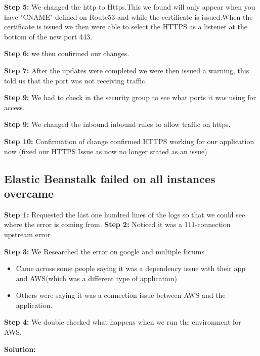 \textbf{Step 5:}\hfill \break
We changed the http to Https.This we found will only appear when you have "CNAME" defined on Route53 and while the certificate is issued.When the certificate is issued we then were able to select the HTTPS as a listener at the bottom of the new port 443.\hfill \break

\textbf{Step 6:}\hfill \break
we then confirmed our changes.\hfill \break

\textbf{Step 7:}\hfill \break
After the updates were completed we were then issued a warning, this told us that the port was not receiving traffic.\hfill \break

\textbf{Step 9:}\hfill \break
We had to check in the security group to see what ports it was using for access.\hfill \break
 
\textbf{Step 9:}\hfill \break
We changed  the inbound inbound rules to allow traffic on https.\hfill \break

\textbf{Step 10:}\hfill \break
Confirmation of change confirmed HTTPS working for our application now (fixed our HTTPS Issue as now no longer stated as an issue)\hfill \break



\hfill \break

\subsection{Elastic Beanstalk failed on all instances overcame }

\hfill \break
\textbf{Step 1:}\hfill \break
Requested the last one hundred lines of the logs so that we could see where the error is coming from.\hfill \break
\hfill \break
\textbf{Step 2:}\hfill \break
Noticed it was a 111-connection upstream error \hfill \break


\textbf{Step 3:}\hfill \break
We Researched the error on google and multiple forums

\begin{itemize}
  \item Came across some people saying it was a dependency issue with their app and AWS(which was a different type of application)
  \item Others were saying it was a connection issue between AWS and the application.
\end{itemize}

\textbf{Step 4:}\hfill \break
We double checked what happens when we run the environment for AWS.\hfill \break

\textbf{Solution:}

